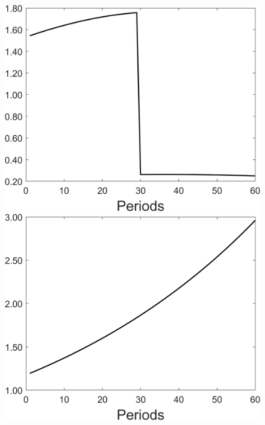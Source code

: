 \begin{figure}[h!!]
\begin{minipage}[]{0.32\textwidth}
	\end{minipage}
	\begin{minipage}[]{0.32\textwidth}
		\includegraphics[width=1\textwidth]{../codding_model/Own/figures/Rep_agent/staticonlyRam_separate_xc_periods59_eppsilon0.40_zeta1.40_Ad08_Ac04_thetac0.70_thetad0.56_HetGrowth1_tauul0.181_util0_withtarget1_lgd0.png}
	\end{minipage}
	\begin{minipage}[]{0.32\textwidth}
		\includegraphics[width=1\textwidth]{../codding_model/Own/figures/Rep_agent/staticonlyRam_separate_ydyc_periods59_eppsilon0.40_zeta1.40_Ad08_Ac04_thetac0.70_thetad0.56_HetGrowth1_tauul0.181_util0_withtarget1_lgd0.png}
	\end{minipage}
\end{figure}


